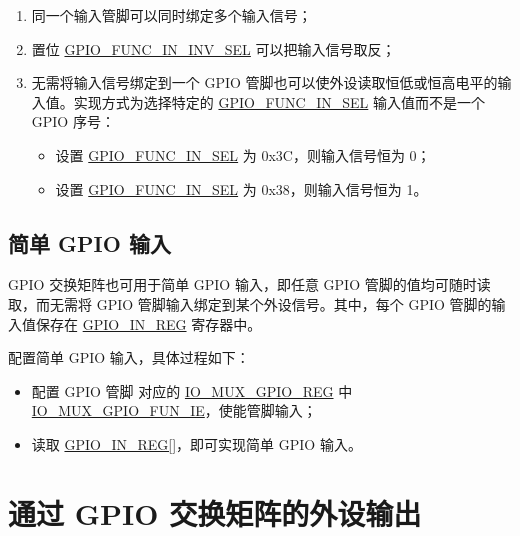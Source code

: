 \documentclass[main\_\_CN.tex]{subfiles}
\begin{document}
\begin{tiplisting}
\vspace{-2em}
\begin{enumerate}
\item \label{input-note-1} 同一个输入管脚可以同时绑定多个输入信号；
\item \label{input-note-2} 置位 \hyperref[fielddesc:GPIOFUNCNININVSEL]{GPIO\_FUNC\_IN\_INV\_SEL} 可以把输入信号取反；
\item \label{input-note-3}无需将输入信号绑定到一个 GPIO 管脚也可以使外设读取恒低或恒高电平的输入值。实现方式为选择特定的 \hyperref[fielddesc:GPIOFUNCNINSEL]{GPIO\_FUNC\_IN\_SEL} 输入值而不是一个 GPIO 序号：
\begin {itemize}
\item 设置 \hyperref[fielddesc:GPIOFUNCNINSEL]{GPIO\_FUNC\_IN\_SEL} 为 0x3C，则输入信号恒为 0；
\item 设置 \hyperref[fielddesc:GPIOFUNCNINSEL]{GPIO\_FUNC\_IN\_SEL} 为 0x38，则输入信号恒为 1。
\end{itemize}
\end{enumerate}
\end{tiplisting}

\subsection{简单 GPIO 输入}\label{IOMUXSimpleGPIOInput}

GPIO 交换矩阵也可用于简单 GPIO 输入，即任意 GPIO 管脚的值均可随时读取，而无需将 GPIO 管脚输入绑定到某个外设信号。其中，每个 GPIO 管脚的输入值保存在 \hyperref[regdesc:GPIOINREG]{GPIO\_IN\_REG} 寄存器中。

配置简单 GPIO 输入，具体过程如下：
\begin{itemize}
    \item 配置 GPIO 管脚  对应的 \hyperref[regdesc:IOMUXGPIONREG]{IO\_MUX\_GPIO\_REG} 中 \hyperref[fielddesc:IOMUXGPIONFUNIE]{IO\_MUX\_GPIO\_FUN\_IE}，使能管脚输入；
    \item 读取 \hyperref[regdesc:GPIOINREG]{GPIO\_IN\_REG[]}，即可实现简单 GPIO 输入。
\end{itemize}

\section{通过 GPIO 交换矩阵的外设输出}
\label{sec:peripheral-output-via-gpio-matrix}
\end{document}

